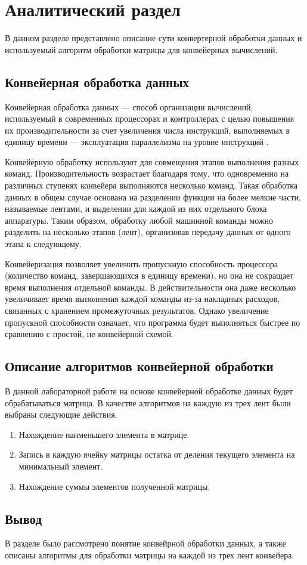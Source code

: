 \chapter{Аналитический раздел}
В данном разделе представлено описание сути конвертерной обработки данных и используемый алгоритм обработки матрицы для конвейерных вычислений.

\section{Конвейерная обработка данных}
Конвейерная обработка данных — способ организации вычислений, используемый в современных процессорах и контроллерах с целью повышения их производительности за счет увеличения числа инструкций, выполняемых в единицу времени — эксплуатация параллелизма на уровне инструкций \cite{conveyor}.

Конвейерную обработку используют для совмещения этапов выполнения разных команд. Производительность возрастает благодаря тому, что одновременно на различных ступенях конвейера выполняются несколько команд. Такая обработка данных в общем случае основана на разделении функции на более мелкие части, называемые лентами, и выделении для каждой из них отдельного блока аппаратуры. Таким образом, обработку любой машинной команды можно разделить на несколько этапов (лент), организовав передачу данных от одного этапа к следующему.

Конвейеризация позволяет увеличить пропускную способность процессора (количество команд, завершающихся в единицу времени), но она не сокращает время выполнения отдельной команды. 
В действительности она даже несколько увеличивает время выполнения каждой команды из-за накладных расходов, связанных с хранением промежуточных результатов. 
Однако увеличение пропускной способности означает, что программа будет выполняться быстрее по сравнению с простой, не конвейерной схемой.

\section{Описание алгоритмов конвейерной обработки}
В данной лабораторной работе на основе конвейерной обработке данных будет обрабатываться матрица. В качестве алгоритмов на каждую из трех лент были выбраны следующие действия.

\begin{enumerate}
	\item Нахождение наименьшего элемента в матрице.
	\item Запись в каждую ячейку матрицы остатка от деления текущего элемента на минимальный элемент.
	\item Нахождение суммы элементов полученной матрицы.
\end{enumerate}

\section*{Вывод}

В разделе было рассмотрено понятие конвейрной обработки данных, а также описаны алгоритмы для обработки матрицы на каждой из трех лент конвейера.